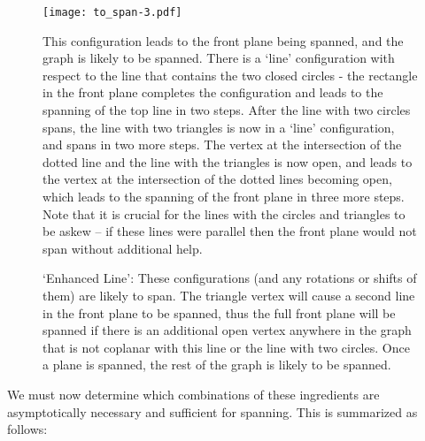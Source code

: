 \documentclass{amsart}
\numberwithin{equation}{section}
\theoremstyle{definition}
\theoremstyle{remark}
\begin{document}
\begin{figure}[htd]
	\centering
	\texttt{[image: to\_span-3.pdf]}
	\caption{This configuration leads to the front plane being spanned, and the graph is likely to be spanned.  There is a `line' configuration with respect to the line that contains the two closed circles - the rectangle in the front plane completes the configuration and leads to the spanning of the top line in two steps.  After the line with two circles spans, the line with two triangles is now in a `line' configuration, and spans in two more steps.  The vertex at the intersection of the dotted line and the line with the triangles is now open, and leads to the vertex at the intersection of the dotted lines becoming open, which leads to the spanning of the front plane in three more steps.  Note that it is crucial for the lines with the circles and triangles to be askew -- if these lines were parallel then the front plane would not span without additional help.}
	\label{tospan3}
\end{figure}

\begin{figure}[htd]
	\centering
	\hspace{.1in}
	\hspace{.1in}
	\caption{`Enhanced Line': These configurations (and any rotations or shifts of them) are likely to span.  The triangle vertex will cause a second line in the front plane to be spanned, thus the full front plane will be spanned if there is an additional open vertex anywhere in the graph that is not coplanar with this line or the line with two circles.  Once a plane is spanned, the rest of the graph is likely to be spanned.}
	\label{tospan5}
\end{figure}

We must now determine which combinations of these ingredients are asymptotically necessary and sufficient for spanning.  This is summarized as follows:
\end{document}

